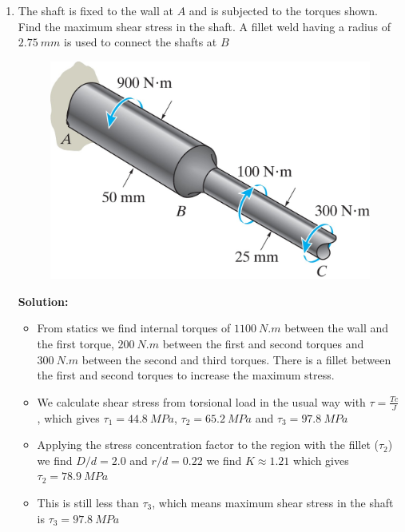 \documentclass[12pt, oneside]{article}
\begin{document}
\begin{enumerate}
	\item %
		The shaft is fixed to the wall at $A$ and is subjected to the torques shown.
		Find the maximum shear stress in the shaft.
		A fillet weld having a radius of $ 	\SI{2.75 }{mm}  $ is used to connect the shafts at $B$
		\begin{figure}[H]
			\centering
			\includegraphics[width=0.6\linewidth]{5-124}
		\end{figure}
			\textbf{Solution:}
			\begin{itemize}
				\item From statics we find internal torques of $ 	\SI{1100}{N.m}  $ between the wall and the first torque, $ 	\SI{200 }{N.m}  $ between the first and second torques and $ 	\SI{300}{N.m}  $ between the second and third torques. There is a fillet between the first and second torques to increase the maximum stress.
				\item We calculate shear stress from torsional load in the usual way with $\tau = \frac{Tc}{J}$, which gives $\tau_1 = 	\SI{44.8 }{MPa} $, $\tau_2 = 	\SI{65.2 }{MPa} $ and $\tau_3 = 	\SI{97.8 }{MPa} $
				\item Applying the stress concentration factor to the region with the fillet ($\tau_2$) we find $D/d = 2.0$ and $r/d = 0.22$ we find $K \approx 1.21$ which gives $\tau_2 = 	\SI{78.9 }{MPa} $
				\item This is still less than $\tau_3$, which means maximum shear stress in the shaft is $\tau_3 = 	\SI{97.8 }{MPa} $
			\end{itemize}


\end{enumerate}
\end{document}
